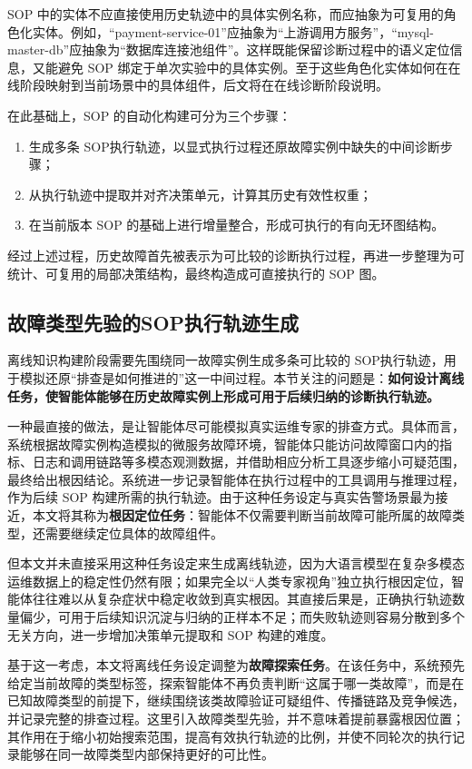 SOP 中的实体不应直接使用历史轨迹中的具体实例名称，而应抽象为可复用的角色化实体。例如，“payment-service-01”应抽象为“上游调用方服务”，“mysql-master-db”应抽象为“数据库连接池组件”。这样既能保留诊断过程中的语义定位信息，又能避免 SOP 绑定于单次实验中的具体实例。至于这些角色化实体如何在在线阶段映射到当前场景中的具体组件，后文将在在线诊断阶段说明。


在此基础上，SOP 的自动化构建可分为三个步骤：

\begin{enumerate}[label=（\arabic*）]
    \item 生成多条 SOP执行轨迹，以显式执行过程还原故障实例中缺失的中间诊断步骤；
    \item 从执行轨迹中提取并对齐决策单元，计算其历史有效性权重；
    \item 在当前版本 SOP 的基础上进行增量整合，形成可执行的有向无环图结构。
\end{enumerate}

经过上述过程，历史故障首先被表示为可比较的诊断执行过程，再进一步整理为可统计、可复用的局部决策结构，最终构造成可直接执行的 SOP 图。

\subsection{故障类型先验的SOP执行轨迹生成}

离线知识构建阶段需要先围绕同一故障实例生成多条可比较的 SOP执行轨迹，用于模拟还原“排查是如何推进的”这一中间过程。本节关注的问题是：\textbf{如何设计离线任务，使智能体能够在历史故障实例上形成可用于后续归纳的诊断执行轨迹。}

一种最直接的做法，是让智能体尽可能模拟真实运维专家的排查方式。具体而言，系统根据故障实例构造模拟的微服务故障环境，智能体只能访问故障窗口内的指标、日志和调用链路等多模态观测数据，并借助相应分析工具逐步缩小可疑范围，最终给出根因结论。系统进一步记录智能体在执行过程中的工具调用与推理过程，作为后续 SOP 构建所需的执行轨迹。由于这种任务设定与真实告警场景最为接近，本文将其称为\textbf{根因定位任务}：智能体不仅需要判断当前故障可能所属的故障类型，还需要继续定位具体的故障组件。

但本文并未直接采用这种任务设定来生成离线轨迹，因为大语言模型在复杂多模态运维数据上的稳定性仍然有限；如果完全以“人类专家视角”独立执行根因定位，智能体往往难以从复杂症状中稳定收敛到真实根因。其直接后果是，正确执行轨迹数量偏少，可用于后续知识沉淀与归纳的正样本不足；而失败轨迹则容易分散到多个无关方向，进一步增加决策单元提取和 SOP 构建的难度。

基于这一考虑，本文将离线任务设定调整为\textbf{故障探索任务}。在该任务中，系统预先给定当前故障的类型标签，探索智能体不再负责判断“这属于哪一类故障”，而是在已知故障类型的前提下，继续围绕该类故障验证可疑组件、传播链路及竞争候选，并记录完整的排查过程。这里引入故障类型先验，并不意味着提前暴露根因位置；其作用在于缩小初始搜索范围，提高有效执行轨迹的比例，并使不同轮次的执行记录能够在同一故障类型内部保持更好的可比性。

